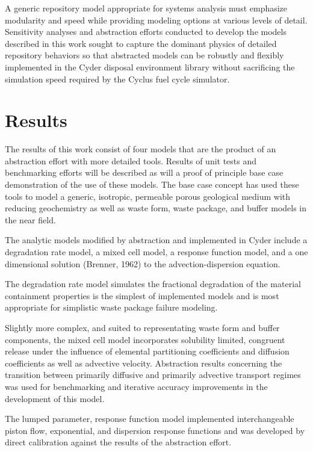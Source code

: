 \documentclass[letterpaper]{article}
\begin{document}
A generic repository model appropriate for systems analysis must emphasize 
modularity and speed while providing modeling options at various levels of 
detail. Sensitivity analyses and abstraction efforts conducted to develop the 
models described in this work sought to capture the dominant physics of detailed 
repository behaviors so that abstracted models can be robustly and flexibly 
implemented in the Cyder disposal environment library without sacrificing the 
simulation speed required by the Cyclus fuel cycle simulator.

\section{Results}

The results of this work consist of four models that are the product of an 
abstraction effort with more detailed tools. Results of unit tests and 
benchmarking efforts will be described as will a proof of principle base case 
demonstration of the use of these models. The base case concept has used these 
tools to model a generic, isotropic, permeable porous geological medium with 
reducing geochemistry as well as waste form, waste package, and buffer models in 
the near field.

The analytic models modified by abstraction and implemented in Cyder include a 
degradation rate model, a mixed cell model, a response function model, and a 
one dimensional solution (Brenner, 1962) to the advection-dispersion equation.

The degradation rate model simulates the fractional degradation of the material 
containment properties is the simplest of implemented models and is most 
appropriate for simplistic waste package failure modeling. 

Slightly more complex, and suited to representating waste form and buffer 
components, the mixed cell model incorporates solubility limited, congruent 
release under the influence of elemental partitioning coefficients and diffusion 
coefficients as well as advective velocity. Abstraction results concerning the 
transition between primarily diffusive and primarily advective transport regimes 
was used for benchmarking and iterative accuracy improvements in the development 
of this model.

The lumped parameter, response function model implemented interchangeable piston flow, 
exponential, and dispersion response functions and was developed by direct 
calibration against the results of the abstraction effort.  
\end{document}
